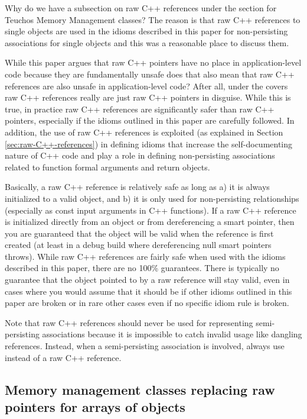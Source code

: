 \documentclass[pdf,ps2pdf,11pt]{SANDreport}
\begin{document}
Why do we have a subsection on raw C++ references under the section
for Teuchos Memory Management classes?  The reason is that raw C++
references to single objects are used in the idioms described in this
paper for non-persisting associations for single objects and this was
a reasonable place to discuss them.

While this paper argues that raw C++ pointers have no place in
application-level code because they are fundamentally unsafe does that
also mean that raw C++ references are also unsafe in application-level
code?  After all, under the covers raw C++ references really are just
raw C++ pointers in disguise.  While this is true, in practice raw C++
references are significantly safer than raw C++ pointers, especially
if the idioms outlined in this paper are carefully followed.  In
addition, the use of raw C++ references is exploited (as explained in
Section {}\ref{sec:raw-C++-references}) in defining idioms that
increase the self-documenting nature of C++ code and play a role in
defining non-persisting associations related to function formal
arguments and return objects.

Basically, a raw C++ reference is relatively safe as long as a) it is
always initialized to a valid object, and b) it is only used for
non-persisting relationships (especially as const input arguments in
C++ functions).  If a raw C++ reference is initialized directly from an
object or from dereferencing a smart pointer, then you are guaranteed
that the object will be valid when the reference is first created (at
least in a debug build where dereferencing null smart pointers
throws).  While raw C++ references are fairly safe when used with the
idioms described in this paper, there are no 100\% guarantees.  There
is typically no guarantee that the object pointed to by a raw reference
will stay valid, even in cases where you would assume that it should
be if other idioms outlined in this paper are broken or in rare other
cases even if no specific idiom rule is broken.

Note that raw C++ references should never be used for representing
semi-persisting associations because it is impossible to catch invalid
usage like dangling references.  Instead, when a semi-persisting
association is involved, always use {} instead of a raw C++
reference.


%
{}\subsection{Memory management classes replacing raw pointers for
arrays of objects}
\label{sec:array-classes}
%
\end{document}
